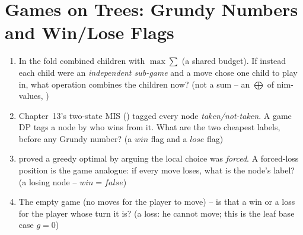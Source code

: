 \section{Games on Trees: Grundy Numbers and Win/Lose Flags}\label{sec:c27-games}

\begin{previouslybox}
\begin{enumerate}[nosep, leftmargin=1.6em]
  \item In  the fold combined children with
        $\max\!\sum$ (a shared budget). If instead each child were an
        \emph{independent sub-game} and a move chose one child to play in, what
        operation combines the children now? (not a sum -- an
        $\bigoplus$ of nim-values, )
  \item Chapter~13's two-state MIS () tagged every node
        \emph{taken/not-taken}. A game DP tags a node by who wins from it.
        What are the two cheapest labels, before any Grundy number? (a
        $\mathit{win}$ flag and a $\mathit{lose}$ flag)
  \item {} proved a greedy optimal by arguing the local choice
        was \emph{forced}. A forced-loss position is the game analogue: if every
        move loses, what is the node's label? (a losing node -- $\mathit{win}=\mathit{false}$)
  \item The empty game (no moves for the player to move) -- is that a win or a
        loss for the player whose turn it is? (a loss: he cannot move; this is
        the leaf base case $g = 0$)
\end{enumerate}
\end{previouslybox}

